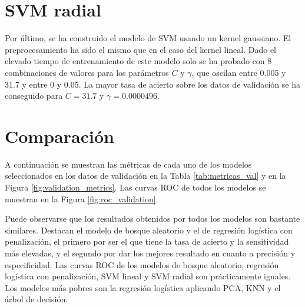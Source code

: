 \documentclass[12pt,a4paper,]{book}
\numberwithin{dummy}{section}
\theoremstyle{ocrenumbox}
\theoremstyle{blacknumex}
\theoremstyle{blacknumbox}
\theoremstyle{ocrenum}
\theoremstyle{ocrenum}
\begin{document}
\hypertarget{svm-radial}{%
\section{SVM radial}\label{svm-radial}}

Por último, se ha construido el modelo de SVM usando un kernel
gaussiano. El preprocesamiento ha sido el mismo que en el caso del
kernel lineal. Dado el elevado tiempo de entrenamiento de este modelo
solo se ha probado con 8 combinaciones de valores para los parámetros
\(C\) y \(\gamma\), que oscilan entre 0.005 y 31.7 y entre 0 y 0.05. La
mayor tasa de acierto sobre los datos de validación se ha conseguido
para \(C = 31.7\) y \(\gamma = 0.0000496\).

\hypertarget{comparaciuxf3n}{%
\section{Comparación}\label{comparaciuxf3n}}

A continuación se muestran las métricas de cada uno de los modelos
seleccionados en los datos de validación en la Tabla
\ref{tab:metricas_val} y en la Figura \ref{fig:validation_metrics}. Las
curvas ROC de todos los modelos se muestran en la Figura
\ref{fig:roc_validation}.

Puede observarse que los resultados obtenidos por todos los modelos son
bastante similares. Destacan el modelo de bosque aleatorio y el de
regresión logística con penalización, el primero por ser el que tiene la
tasa de acierto y la sensitividad más elevadas, y el segundo por dar los
mejores resultado en cuanto a precisión y especificidad. Las curvas ROC
de los modelos de bosque aleatorio, regresión logística con
penalización, SVM lineal y SVM radial son prácticamente iguales. Los
modelos más pobres son la regresión logística aplicando PCA, KNN y el
árbol de decisión.
\end{document}
